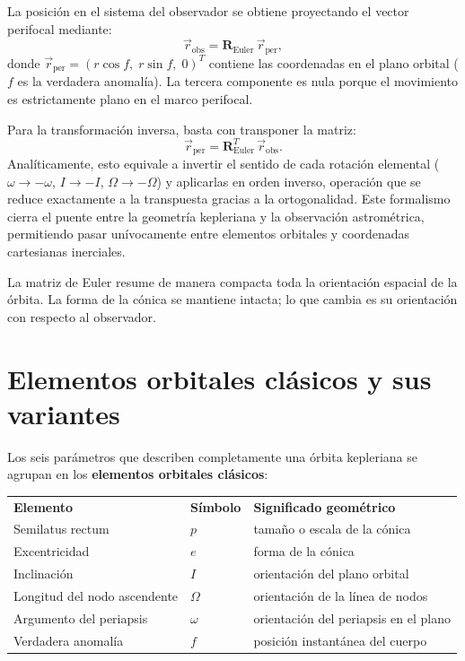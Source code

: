 La posición en el sistema del observador se obtiene proyectando el vector perifocal mediante:
\[
\vec{r}_{\text{obs}} = \mathbf{R}_{\text{Euler}}\,\vec{r}_{\text{per}},
\]
donde $\vec{r}_{\text{per}} = (r\cos f,\; r\sin f,\; 0)^T$ contiene las coordenadas en el plano orbital ($f$ es la verdadera anomalía). La tercera componente es nula porque el movimiento es estrictamente plano en el marco perifocal.

Para la transformación inversa, basta con transponer la matriz:
\[
\vec{r}_{\text{per}} = \mathbf{R}_{\text{Euler}}^T\,\vec{r}_{\text{obs}}.
\]
Analíticamente, esto equivale a invertir el sentido de cada rotación elemental ($\omega \to -\omega$, $I \to -I$, $\Omega \to -\Omega$) y aplicarlas en orden inverso, operación que se reduce exactamente a la transpuesta gracias a la ortogonalidad. Este formalismo cierra el puente entre la geometría kepleriana y la observación astrométrica, permitiendo pasar unívocamente entre elementos orbitales y coordenadas cartesianas inerciales.

\begin{importante}
La matriz de Euler resume de manera compacta toda la orientación espacial de la órbita. La forma de la cónica se mantiene intacta; lo que cambia es su orientación con respecto al observador.
\end{importante}

\section{Elementos orbitales clásicos y sus variantes}
Los seis parámetros que describen completamente una órbita kepleriana se agrupan en los \textbf{elementos orbitales clásicos}:
\begin{center}
\begin{tabular}{lll}
\textbf{Elemento} & \textbf{Símbolo} & \textbf{Significado geométrico} \\
Semilatus rectum & \(p\) & tamaño o escala de la cónica \\
Excentricidad & \(e\) & forma de la cónica \\
Inclinación & \(I\) & orientación del plano orbital \\
Longitud del nodo ascendente & \(\Omega\) & orientación de la línea de nodos \\
Argumento del periapsis & \(\omega\) & orientación del periapsis en el plano \\
Verdadera anomalía & \(f\) & posición instantánea del cuerpo
\end{tabular}
\end{center}

